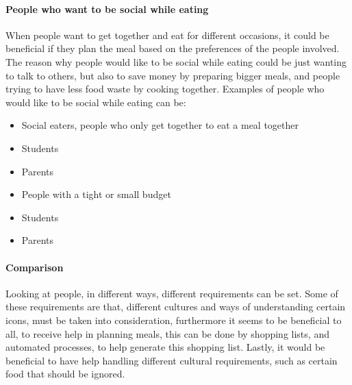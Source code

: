 \paragraph{People who want to be social while eating}
When people want to get together and eat for different occasions, it could be beneficial if they plan the meal based on the preferences of the people involved. The reason why people would like to be social while eating could be just wanting to talk to others, but also to save money by preparing bigger meals, and people trying to have less food waste by cooking together. Examples of people who would like to be social while eating can be:
\begin{itemize}
\item Social eaters, people who only get together to eat a meal together
\item Students
\item Parents
\item People with a tight or small budget
\item Students
\item Parents
\end{itemize}

\paragraph{Comparison}
Looking at people, in different ways, different requirements can be set. Some of these requirements are that, different cultures and ways of understanding certain icons, must be taken into consideration, furthermore it seems to be beneficial to all, to receive help in planning meals, this can be done by shopping lists, and automated processes, to help generate this shopping list. Lastly, it would be beneficial to have help handling different cultural requirements, such as certain food that should be ignored. 